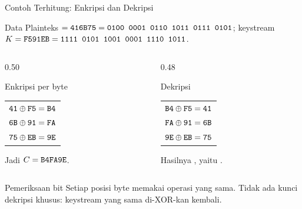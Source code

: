 \documentclass[aspectratio=169,11pt]{beamer}
\begin{document}
\begin{frame}{Contoh Terhitung: Enkripsi dan Dekripsi}
    \footnotesize
    \begin{block}{Data}
        Plainteks  $=\texttt{416B75}
        =\texttt{0100 0001 0110 1011 0111 0101}$; keystream
        $K=\texttt{F591EB}=\texttt{1111 0101 1001 0001 1110 1011}$.
    \end{block}
    \vspace{0.05cm}
    \begin{columns}[T,onlytextwidth]
        \begin{column}{0.50\textwidth}
            \begin{block}{Enkripsi per byte}
                \begin{tabular}{@{}l@{}}
                    $\texttt{41}\oplus\texttt{F5}=\texttt{B4}$ \\
                    $\texttt{6B}\oplus\texttt{91}=\texttt{FA}$ \\
                    $\texttt{75}\oplus\texttt{EB}=\texttt{9E}$ \\
                \end{tabular}
                \vspace{0.1cm}

                Jadi $C=\texttt{B4FA9E}$.
            \end{block}
        \end{column}
        \begin{column}{0.48\textwidth}
            \begin{block}{Dekripsi}
                \begin{tabular}{@{}l@{}}
                    $\texttt{B4}\oplus\texttt{F5}=\texttt{41}$ \\
                    $\texttt{FA}\oplus\texttt{91}=\texttt{6B}$ \\
                    $\texttt{9E}\oplus\texttt{EB}=\texttt{75}$ \\
                \end{tabular}
                \vspace{0.1cm}

                Hasilnya , yaitu .
            \end{block}
        \end{column}
    \end{columns}
    \vspace{0.1cm}
    \begin{exampleblock}{Pemeriksaan bit}
        Setiap posisi byte memakai operasi yang sama. Tidak ada kunci
        dekripsi khusus: keystream yang sama di-XOR-kan kembali.
    \end{exampleblock}
\end{frame}
\end{document}
